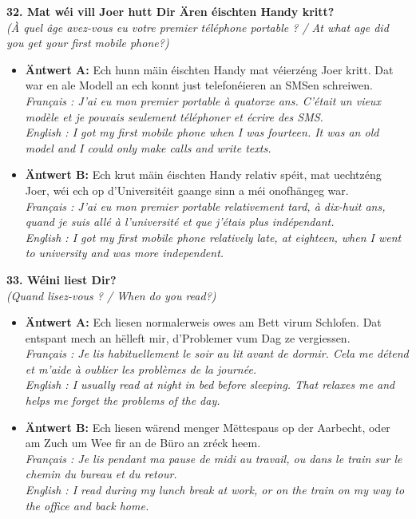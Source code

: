 \noindent\textbf{32. Mat wéi vill Joer hutt Dir Ären éischten Handy kritt?}\\
\textit{(À quel âge avez-vous eu votre premier téléphone portable ? / At what age did you get your first mobile phone?)}
\begin{itemize}
    \item \textbf{Äntwert A:} Ech hunn mäin éischten Handy mat véierzéng Joer kritt. Dat war en ale Modell an ech konnt just telefonéieren an SMSen schreiwen.\\
    \textit{Français : J'ai eu mon premier portable à quatorze ans. C'était un vieux modèle et je pouvais seulement téléphoner et écrire des SMS.}\\
    \textit{English : I got my first mobile phone when I was fourteen. It was an old model and I could only make calls and write texts.}
    \item \textbf{Äntwert B:} Ech krut mäin éischten Handy relativ spéit, mat uechtzéng Joer, wéi ech op d'Universitéit gaange sinn a méi onofhängeg war.\\
    \textit{Français : J'ai eu mon premier portable relativement tard, à dix-huit ans, quand je suis allé à l'université et que j'étais plus indépendant.}\\
    \textit{English : I got my first mobile phone relatively late, at eighteen, when I went to university and was more independent.}
\end{itemize}
\vspace{0.5em}

\noindent\textbf{33. Wéini liest Dir?}\\
\textit{(Quand lisez-vous ? / When do you read?)}
\begin{itemize}
    \item \textbf{Äntwert A:} Ech liesen normalerweis owes am Bett virum Schlofen. Dat entspant mech an hëlleft mir, d'Problemer vum Dag ze vergiessen.\\
    \textit{Français : Je lis habituellement le soir au lit avant de dormir. Cela me détend et m'aide à oublier les problèmes de la journée.}\\
    \textit{English : I usually read at night in bed before sleeping. That relaxes me and helps me forget the problems of the day.}
    \item \textbf{Äntwert B:} Ech liesen wärend menger Mëttespaus op der Aarbecht, oder am Zuch um Wee fir an de Büro an zréck heem.\\
    \textit{Français : Je lis pendant ma pause de midi au travail, ou dans le train sur le chemin du bureau et du retour.}\\
    \textit{English : I read during my lunch break at work, or on the train on my way to the office and back home.}
\end{itemize}
\vspace{0.5em}

